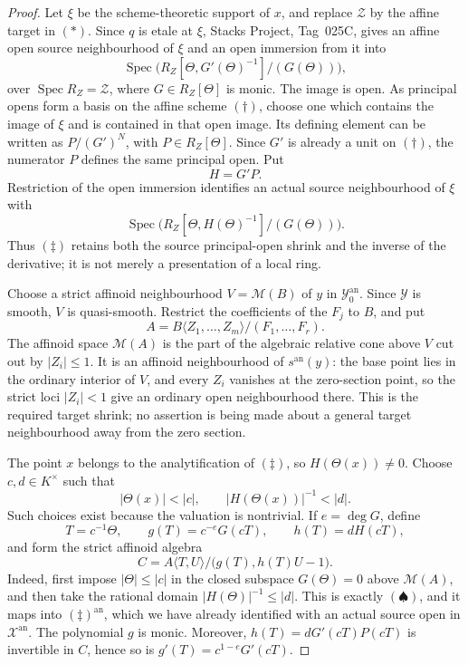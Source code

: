\begin{proof}
Let \(\xi\) be the scheme-theoretic support of \(x\), and replace
\(\mathcal Z\) by the affine target in \((*)\).  Since \(q\) is etale at
\(\xi\), Stacks Project, Tag~025C, gives an affine open source neighbourhood
of \(\xi\) and an open immersion from it into
\[
 \operatorname{Spec}
 \bigl(R_Z[\Theta,G'(\Theta)^{-1}]/(G(\Theta))\bigr),               \tag{\(\dagger\)}
\]
over \(\operatorname{Spec}R_Z=\mathcal Z\), where \(G\in R_Z[\Theta]\)
is monic.  The image is open.  As principal opens form a basis on the
affine scheme \((\dagger)\), choose one which contains the image of
\(\xi\) and is contained in that open image.  Its defining element can be
written as \(P/(G')^N\), with \(P\in R_Z[\Theta]\).  Since \(G'\) is
already a unit on \((\dagger)\), the numerator \(P\) defines the same
principal open.  Put
\[
                              H=G'P.
\]
Restriction of the open immersion identifies an actual source
neighbourhood of \(\xi\) with
\[
 \operatorname{Spec}
 \bigl(R_Z[\Theta,H(\Theta)^{-1}]/(G(\Theta))\bigr).                \tag{\(\ddagger\)}
\]
Thus \((\ddagger)\) retains both the source principal-open shrink and the
inverse of the derivative; it is not merely a presentation of a local ring.

Choose a strict affinoid neighbourhood \(V=\mathcal M(B)\) of \(y\) in
\(\mathcal Y_0^{\mathrm{an}}\).  Since \(\mathcal Y\) is smooth, \(V\) is
quasi-smooth.  Restrict the coefficients of the \(F_j\) to \(B\), and put
\[
 A=B\langle Z_1,\ldots,Z_m\rangle/(F_1,\ldots,F_r).
\]
The affinoid space \(\mathcal M(A)\) is the part of the algebraic relative
cone above \(V\) cut out by \(|Z_i|\leq1\).  It is an affinoid
neighbourhood of \(s^{\mathrm{an}}(y)\): the base point lies in the ordinary
interior of \(V\), and every \(Z_i\) vanishes at the zero-section point, so
the strict loci \(|Z_i|<1\) give an ordinary open neighbourhood there.
This is the required target shrink; no assertion is being made about a
general target neighbourhood away from the zero section.

The point \(x\) belongs to the analytification of \((\ddagger)\), so
\(H(\Theta(x))\ne0\).  Choose \(c,d\in K^\times\) such that
\[
                 |\Theta(x)|<|c|,
        \qquad |H(\Theta(x))|^{-1}<|d|.                             \tag{\(\clubsuit\)}
\]
Such choices exist because the valuation is nontrivial.  If
\(e=\deg G\), define
\[
 T=c^{-1}\Theta,
 \qquad g(T)=c^{-e}G(cT),
 \qquad h(T)=dH(cT),
\]
and form the strict affinoid algebra
\[
 C=A\langle T,U\rangle/\bigl(g(T),h(T)U-1\bigr).                   \tag{\(\spadesuit\)}
\]
Indeed, first impose \(|\Theta|\leq|c|\) in the closed subspace
\(G(\Theta)=0\) above \(\mathcal M(A)\), and then take the rational domain
\(|H(\Theta)|^{-1}\leq|d|\).  This is exactly \((\spadesuit)\), and it
maps into \((\ddagger)^{\mathrm{an}}\), which we have already identified with
an actual source open in \(\mathcal X^{\mathrm{an}}\).  The polynomial \(g\)
is monic.
Moreover,
\(h(T)=dG'(cT)P(cT)\) is invertible in \(C\), hence so is
\(g'(T)=c^{1-e}G'(cT)\).


\end{proof}
